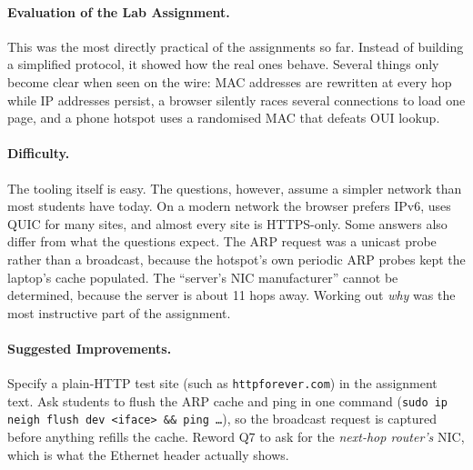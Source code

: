 \documentclass[11pt]{article}
\begin{document}
\paragraph{Evaluation of the Lab Assignment.} This was the most directly practical of the
assignments so far. Instead of building a simplified protocol, it showed how the real ones
behave. Several things only become clear when seen on the wire: MAC addresses are
rewritten at every hop while IP addresses persist, a browser silently races several connections
to load one page, and a phone hotspot uses a randomised MAC that defeats OUI lookup.

\paragraph{Difficulty.} The tooling itself is easy. The questions, however, assume a
simpler network than most students have today. On a modern network the browser prefers
IPv6, uses QUIC for many sites, and almost every site is HTTPS-only. Some answers also differ
from what the questions expect. The ARP request was a unicast probe rather than a broadcast,
because the hotspot's own periodic ARP probes kept the laptop's cache populated. The ``server's NIC manufacturer'' cannot be
determined, because the server is about 11 hops away. Working out \emph{why} was the most
instructive part of the assignment.

\paragraph{Suggested Improvements.} Specify a plain-HTTP test site (such as
\texttt{httpforever.com}) in the assignment text. Ask students to flush the ARP cache and ping
in one command (\texttt{sudo ip neigh flush dev <iface> \&\& ping \ldots}), so the
broadcast request is captured before anything refills the cache. Reword Q7 to ask for the \emph{next-hop
router's} NIC, which is what the Ethernet header actually shows.
\end{document}
